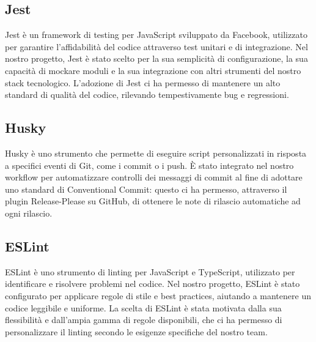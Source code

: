 \subsection{Jest}
Jest è un framework di testing per JavaScript sviluppato da Facebook, utilizzato per garantire l'affidabilità del codice attraverso test unitari e di integrazione. Nel nostro progetto, Jest è stato scelto per la sua semplicità di configurazione, la sua capacità di mockare moduli e la sua integrazione con altri strumenti del nostro stack tecnologico. L'adozione di Jest ci ha permesso di mantenere un alto standard di qualità del codice, rilevando tempestivamente bug e regressioni.

\subsection{Husky}
Husky è uno strumento che permette di eseguire script personalizzati in risposta a specifici eventi di Git, come i commit o i push. È stato integrato nel nostro workflow per automatizzare controlli dei messaggi di commit al fine di adottare uno standard di Conventional Commit: questo ci ha permesso, attraverso il plugin Release-Please su GitHub, di ottenere le note di rilascio automatiche ad ogni rilascio.

\subsection{ESLint}
ESLint è uno strumento di linting per JavaScript e TypeScript, utilizzato per identificare e risolvere problemi nel codice. Nel nostro progetto, ESLint è stato configurato per applicare regole di stile e best practices, aiutando a mantenere un codice leggibile e uniforme. La scelta di ESLint è stata motivata dalla sua flessibilità e dall'ampia gamma di regole disponibili, che ci ha permesso di personalizzare il linting secondo le esigenze specifiche del nostro team.
